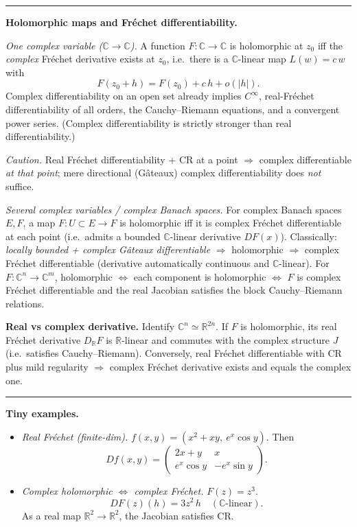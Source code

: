 \documentclass[12pt,a4paper]{article}
\theoremstyle{plain}
\theoremstyle{definition}
\theoremstyle{remark}
\theoremstyle{remark}
\newcommand{\sep}{\vspace{6pt}\hrule\vspace{8pt}}
\begin{document}
	\sep
	
	\textbf{Holomorphic maps and Fr\'echet differentiability.}
	
	\emph{One complex variable ($\mathbb{C}\to\mathbb{C}$).}
	A function $F:\mathbb{C}\to\mathbb{C}$ is holomorphic at $z_0$ iff the \emph{complex} Fr\'echet
	derivative exists at $z_0$, i.e.\ there is a $\mathbb{C}$-linear map $L(w)=c\,w$ with
	\[
	F(z_0+h)=F(z_0)+c\,h+o(|h|).
	\]
	Complex differentiability on an open set already implies $C^\infty$, real-Fr\'echet
	differentiability of all orders, the Cauchy--Riemann equations, and a convergent power series.
	(Complex differentiability is strictly stronger than real differentiability.)
	
	\emph{Caution.}
	Real Fr\'echet differentiability + CR at a point $\Rightarrow$ complex differentiable \emph{at that
		point}; mere directional (G\^ateaux) complex differentiability does \emph{not} suffice.
	
	\emph{Several complex variables / complex Banach spaces.}
	For complex Banach spaces $E,F$, a map $F:U\subset E\to F$ is holomorphic iff it is complex
	Fr\'echet differentiable at each point (i.e.\ admits a bounded $\mathbb{C}$-linear derivative $DF(x)$).
	Classically: \emph{locally bounded + complex G\^ateaux differentiable} $\Rightarrow$ holomorphic
	$\Rightarrow$ complex Fr\'echet differentiable (derivative automatically continuous and
	$\mathbb{C}$-linear). For $F:\mathbb{C}^n\to\mathbb{C}^m$, holomorphic $\iff$ each component is
	holomorphic $\iff$ $F$ is complex Fr\'echet differentiable and the real Jacobian satisfies the
	block Cauchy--Riemann relations.
	
	\textbf{Real vs complex derivative.}
	Identify $\mathbb{C}^n\simeq\mathbb{R}^{2n}$. If $F$ is holomorphic, its real Fr\'echet derivative
	$D_{\mathbb{R}}F$ is $\mathbb{R}$-linear and commutes with the complex structure $J$ (i.e.\ satisfies
	Cauchy--Riemann). Conversely, real Fr\'echet differentiable with CR plus mild regularity
	$\Rightarrow$ complex Fr\'echet derivative exists and equals the complex one.
	
	\sep
	
	\textbf{Tiny examples.}
	\begin{itemize}
		\item \emph{Real Fr\'echet (finite-dim).} $f(x,y)=(x^2+xy,\ e^x\cos y)$. Then
		\[
		Df(x,y)=
		\begin{pmatrix}
			2x+y & x\\[2pt]
			e^x\cos y & -e^x\sin y
		\end{pmatrix}.
		\]
		\item \emph{Complex holomorphic $\Leftrightarrow$ complex Fr\'echet.} $F(z)=z^3$.
		\[
		DF(z)(h)=3z^2\,h \quad (\text{$\mathbb{C}$-linear}).
		\]
		As a real map $\mathbb{R}^2\to\mathbb{R}^2$, the Jacobian satisfies CR.
	\end{itemize}
	
\end{document}
